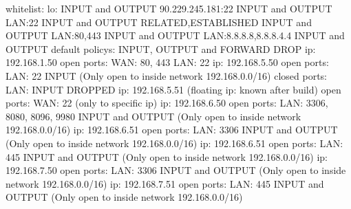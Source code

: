 \markdownRendererInterblockSeparator
{}\markdownRendererInterblockSeparator
{}whitelist:\markdownRendererLineBreak
{}lo: INPUT and OUTPUT\markdownRendererLineBreak
{}90.229.245.181:22 INPUT and OUTPUT\markdownRendererLineBreak
{}LAN:22 INPUT and OUTPUT\markdownRendererLineBreak
{}RELATED,ESTABLISHED INPUT and OUTPUT\markdownRendererLineBreak
{}LAN:80,443 INPUT and OUTPUT\markdownRendererLineBreak
{}LAN:8.8.8.8,8.8.8.4.4 INPUT and OUTPUT\markdownRendererInterblockSeparator
{}default policys:\markdownRendererLineBreak
{}INPUT, OUTPUT and FORWARD DROP\markdownRendererInterblockSeparator
{}\markdownRendererInterblockSeparator
{}ip: 192.168.1.50\markdownRendererLineBreak
{}open ports:\markdownRendererLineBreak
{}WAN: 80, 443\markdownRendererLineBreak
{}LAN: 22\markdownRendererInterblockSeparator
{}\markdownRendererInterblockSeparator
{}ip: 192.168.5.50\markdownRendererLineBreak
{}open ports:\markdownRendererLineBreak
{}LAN: 22 INPUT\markdownRendererLineBreak
{}(Only open to inside network 192.168.0.0/16)\markdownRendererLineBreak
{}closed ports:\markdownRendererLineBreak
{}LAN: INPUT DROPPED\markdownRendererInterblockSeparator
{}\markdownRendererInterblockSeparator
{}ip: 192.168.5.51 (floating ip: known after build)\markdownRendererLineBreak
{}open ports:\markdownRendererLineBreak
{}WAN: 22\markdownRendererLineBreak
{}(only to specific ip)\markdownRendererInterblockSeparator
{}\markdownRendererInterblockSeparator
{}ip: 192.168.6.50\markdownRendererLineBreak
{}open ports:\markdownRendererLineBreak
{}LAN: 3306, 8080, 8096, 9980 INPUT and OUTPUT\markdownRendererLineBreak
{}(Only open to inside network 192.168.0.0/16)\markdownRendererInterblockSeparator
{}\markdownRendererInterblockSeparator
{}ip: 192.168.6.51\markdownRendererLineBreak
{}open ports:\markdownRendererLineBreak
{}LAN: 3306 INPUT and OUTPUT\markdownRendererLineBreak
{}(Only open to inside network 192.168.0.0/16)\markdownRendererInterblockSeparator
{}\markdownRendererInterblockSeparator
{}ip: 192.168.6.51\markdownRendererLineBreak
{}open ports:\markdownRendererLineBreak
{}LAN: 445 INPUT and OUTPUT\markdownRendererLineBreak
{}(Only open to inside network 192.168.0.0/16)\markdownRendererInterblockSeparator
{}\markdownRendererInterblockSeparator
{}ip: 192.168.7.50\markdownRendererLineBreak
{}open ports:\markdownRendererLineBreak
{}LAN: 3306 INPUT and OUTPUT\markdownRendererLineBreak
{}(Only open to inside network 192.168.0.0/16)\markdownRendererInterblockSeparator
{}\markdownRendererInterblockSeparator
{}ip: 192.168.7.51\markdownRendererLineBreak
{}open ports:\markdownRendererLineBreak
{}LAN: 445 INPUT and OUTPUT\markdownRendererLineBreak
{}(Only open to inside network 192.168.0.0/16)\relax